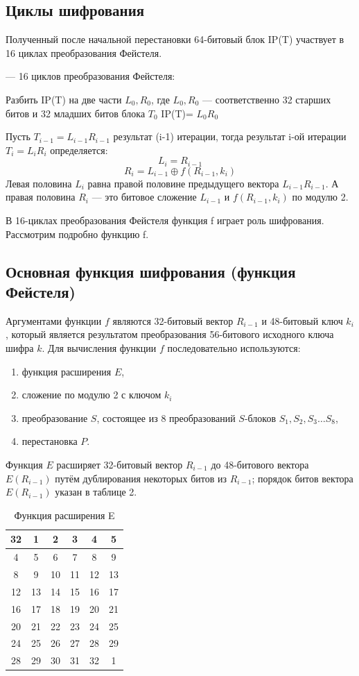 \subsection{Циклы шифрования}

Полученный после начальной перестановки 64-битовый блок IP(T) участвует в 16 циклах преобразования Фейстеля.

— 16 циклов преобразования Фейстеля:

Разбить IP(T) на две части $L_0,R_0$, где $L_0, R_0$ — соответственно 32 старших битов и 32 младших битов блока $T_0$ IP(T)= $L_0R_0$

Пусть $T_{i-1} = L_{i-1}R_{i-1}$ результат (i-1) итерации, тогда результат i-ой итерации $T_{i}=L_{i}R_{i}$ определяется:
\[L_{i}=R_{i-1}\]
\[R_{i}=L_{i-1}\oplus f(R_{i-1},k_{i})\]
Левая половина $L_{i}$ равна правой половине предыдущего вектора $L_{i-1}R_{i-1}$. А правая половина $R_{i}$ — это битовое сложение $L_{i-1}$ и $f(R_{i-1},k_{i})$ по модулю 2.

В 16-циклах преобразования Фейстеля функция f играет роль шифрования. Рассмотрим подробно функцию f.

\subsection{Основная функция шифрования (функция Фейстеля)}

Аргументами функции $f$ являются 32-битовый вектор $R_{i-1}$ и 48-битовый ключ $k_{i}$, который является результатом преобразования 56-битового исходного ключа шифра $k$. Для вычисления функции $f$ последовательно используются:
\begin{enumerate}
    \item функция расширения $E$,
    \item сложение по модулю 2 с ключом $k_i$
    \item преобразование $S$, состоящее из 8 преобразований $S$-блоков $S_{1}, S_{2}, S_{3 }\ldots S_8$,
    \item перестановка $P$.
\end{enumerate}

Функция $E$ расширяет 32-битовый вектор $R_{i-1}$ до 48-битового вектора $E(R_{i-1})$ путём дублирования некоторых битов из $R_{i-1}$; порядок битов вектора $E(R_{i-1})$ указан в таблице 2.
\begin{table}[H]
    \caption{Функция расширения E}
	\begin{tabular}{|c|c|c|c|c|c|}
    \hline
    32	& 1	& 2	& 3	& 4	& 5\\
    \hline
    4	& 5	& 6	& 7	& 8	& 9\\
    \hline
    8	& 9	& 10	& 11	& 12	& 13\\
    \hline
    12	& 13	& 14	& 15	& 16	& 17\\
    \hline
    16	& 17	& 18	& 19	& 20	& 21\\
    \hline
    20	& 21 &	22	& 23	& 24	& 25\\
    \hline
    24	& 25	& 26	& 27	& 28	& 29\\
    \hline
    28	& 29	& 30	& 31	& 32	& 1\\
    \hline
	\end{tabular}
\end{table}

